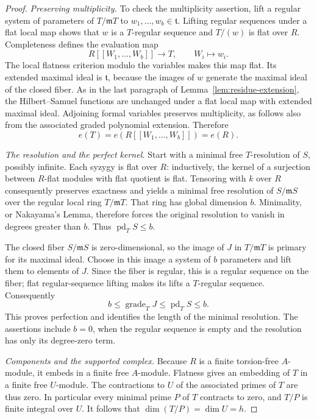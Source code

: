 \begin{proof}
\smallskip
\noindent\emph{Preserving multiplicity.}
To check the multiplicity assertion, lift a regular system of
parameters of $T/\mathfrak mT$ to $w_1,\ldots,w_b\in\mathfrak t$.
Lifting regular sequences under a flat local map
\cite[Tag~00MG]{Stacks} shows that $w$ is a
$T$-regular sequence and $T/(w)$ is flat over $R$.  Completeness
defines the evaluation map
\[
   R[[W_1,\ldots,W_b]]\longrightarrow T,\qquad W_i\longmapsto w_i.
\]
The local flatness criterion modulo the variables
\cite[Tag~00ML]{Stacks} makes this map flat.
Its extended maximal ideal is $\mathfrak t$, because the images of
$w$ generate the maximal ideal of the closed fiber.  As in the last
paragraph of Lemma~\ref{lem:residue-extension}, the Hilbert--Samuel
functions are unchanged under a flat local map with extended maximal
ideal.  Adjoining formal variables preserves multiplicity, as follows
also from the associated graded polynomial extension.  Therefore
\[
  e(T)=e(R[[W_1,\ldots,W_b]])=e(R).
\]

\smallskip
\noindent\emph{The resolution and the perfect kernel.}
Start with a minimal free $T$-resolution of $S$, possibly infinite.
Each syzygy is flat over $R$:
inductively, the kernel of a surjection between $R$-flat modules with
flat quotient is flat.  Tensoring with $k$ over $R$ consequently
preserves exactness and yields a minimal free resolution of
$S/\mathfrak mS$ over the regular local ring $T/\mathfrak mT$.
That ring has global dimension $b$.  Minimality, or Nakayama's Lemma,
therefore forces the original resolution to vanish in degrees greater
than $b$.  Thus $\operatorname{pd}_T S\leq b$.

The closed fiber $S/\mathfrak mS$ is zero-dimensional, so the image of
$J$ in $T/\mathfrak mT$ is primary for its maximal ideal.  Choose in
this image a system of $b$ parameters and lift them to elements of
$J$.  Since the fiber is regular, this is a regular sequence on the
fiber; flat regular-sequence lifting makes its lifts a $T$-regular
sequence.  Consequently
\[
 b\leq\operatorname{grade}_T J
   \leq\operatorname{pd}_T S\leq b.
\]
This proves perfection and identifies the length of the minimal
resolution.  The assertions include $b=0$, when the regular sequence
is empty and the resolution has only its degree-zero term.

\smallskip
\noindent\emph{Components and the supported complex.}
Because $R$ is a finite torsion-free $A$-module, it embeds in a finite
free $A$-module.  Flatness gives an embedding of $T$ in a finite free
$U$-module.  The contractions to $U$ of the associated primes of $T$
are thus zero.  In particular every minimal prime $P$ of $T$ contracts
to zero, and $T/P$ is finite integral over $U$.  It follows that
$\dim(T/P)=\dim U=h$.


\end{proof}
